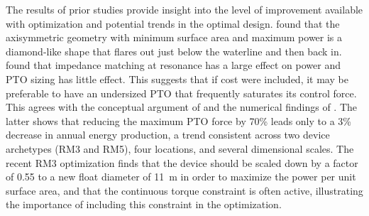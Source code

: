 The results of prior studies provide insight into the level of improvement available with optimization and potential trends in the optimal design.
\cite{edwards_optimisation_2022} found that the axisymmetric geometry with minimum surface area and maximum power is a diamond-like shape that flares out just below the waterline and then back in.
\cite{devin_high-dimensional_2024} found that impedance matching at resonance has a large effect on power and PTO sizing has little effect.
This suggests that if cost were included, it may be preferable to have an undersized PTO that frequently saturates its control force.
This agrees with the conceptual argument of \cite{coe_maybe_2021} and the numerical findings of \cite{mcgilton_optimal_2024}.
The latter shows that reducing the maximum PTO force by 70\% leads only to a 3\% decrease in annual energy production, a trend consistent across two device archetypes (RM3 and RM5), four locations, and several dimensional scales.
The recent RM3 optimization \cite{gaebele_tpl_2025} finds that the device should be scaled down by a factor of 0.55 to a new float diameter of 11~m in order to maximize the power per unit surface area, and that the continuous torque constraint is often active, illustrating the importance of including this constraint in the optimization.


